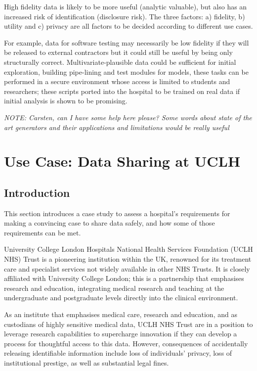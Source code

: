 \documentclass[11pt]{article}
\begin{document}
High fidelity data is likely to be more useful (analytic valuable), but also has an increased risk of identification (disclosure risk). The three factors: a) fidelity, b) utility and c) privacy are all factors to be decided according to different use cases. 

For example, data for software testing may necessarily be low fidelity if they will be released to external contractors but it could still be useful by being only structurally correct.  Multivariate-plausible data could be sufficient for initial exploration, building pipe-lining and test modules for models, these tasks can be performed in a secure environment whose access is limited to students and researchers; these scripts ported into the hospital to be trained on real data if initial analysis is shown to be promising.

\textit{NOTE: Carsten, can I have some help here please? Some words about state of the art generators and their applications and limitations would be really useful}

\section{Use Case: Data Sharing at UCLH}

\subsection{Introduction}

This section introduces a case study to assess a hospital's requirements for making a convincing case to share data safely, and how some of those requirements can be met. 

University College London Hospitals National Health Services Foundation (UCLH NHS) Trust  is a pioneering institution within the UK, renowned for its treatment care and specialist services not widely available in other NHS Trusts. It is closely affiliated with University College London; this is a partnership that emphasises research and education, integrating medical research and teaching at the undergraduate and postgraduate levels directly into the clinical environment. 

As an institute that emphasises medical care, research and education, and as custodians of highly sensitive medical data, UCLH NHS Trust are in a position to leverage research capabilities to supercharge innovation if they can develop a process for thoughtful access to this data. However, consequences of accidentally releasing identifiable information include loss of individuals' privacy, loss of institutional prestige, as well as substantial legal fines.
\end{document}
